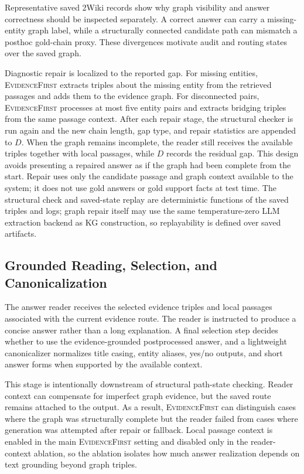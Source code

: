 \documentclass[runningheads,a4paper]{llncs}
\newcommand{\sys}{\textsc{EvidenceFirst}\xspace}
\begin{document}
Representative saved 2Wiki records show why graph visibility and answer
correctness should be inspected separately. A correct answer can carry a
missing-entity graph label, while a structurally connected candidate path can
mismatch a posthoc gold-chain proxy. These divergences motivate audit and routing
states over the saved graph.

Diagnostic repair is localized to the reported gap. For missing entities, \sys
extracts triples about the missing entity from the retrieved passages and adds
them to the evidence graph. For disconnected pairs, \sys processes at most five
entity pairs and extracts bridging triples from the same passage context. After
each repair stage, the structural checker is run again and the new chain length, gap type,
and repair statistics are appended to $D$. When the graph remains incomplete,
the reader still receives the available triples together with local passages,
while $D$ records the residual gap. This design avoids presenting a repaired
answer as if the graph had been complete from the start. Repair uses only the
candidate passage and graph context available to the system; it does not use
gold answers or gold support facts at test time. The structural check and
saved-state replay are deterministic functions of the saved triples and logs;
graph repair itself may use the same temperature-zero LLM extraction backend as
KG construction, so replayability is defined over saved artifacts.

\subsection{Grounded Reading, Selection, and Canonicalization}

The answer reader receives the selected evidence triples and local passages
associated with the current evidence route. The reader is instructed to produce
a concise answer rather than a long explanation. A final selection step decides
whether to use the evidence-grounded postprocessed answer, and a lightweight
canonicalizer normalizes title casing, entity aliases, yes/no outputs, and short
answer forms when supported by the available context.

This stage is intentionally downstream of structural path-state checking. Reader
context can compensate for imperfect graph evidence, but the saved route remains
attached to the output. As a result, \sys can distinguish cases where the graph
was structurally complete but the reader failed from cases where generation was
attempted after repair or fallback. Local passage context is enabled in the main
\sys setting and disabled only in the reader-context ablation, so the ablation
isolates how much answer realization depends on text grounding beyond graph
triples.
\end{document}
